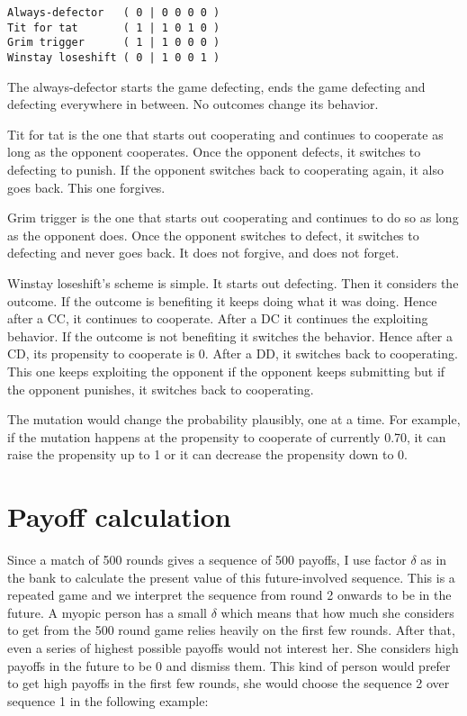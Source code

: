 \documentclass[12.5pt]{report}
\begin{document}
\begin{verbatim}
Always-defector   ( 0 | 0 0 0 0 )
Tit for tat       ( 1 | 1 0 1 0 )
Grim trigger      ( 1 | 1 0 0 0 )
Winstay loseshift ( 0 | 1 0 0 1 )
\end{verbatim}

The always-defector starts the game defecting, ends the game defecting and defecting everywhere in between. No outcomes change its behavior.

Tit for tat is the one that starts out cooperating and continues to cooperate as long as the opponent cooperates. Once the opponent defects, it switches to defecting to punish. If the opponent switches back to cooperating again, it also goes back. This one forgives.

Grim trigger is the one that starts out cooperating and continues to do so as long as the opponent does. Once the opponent switches to defect, it switches to defecting and never goes back. It does not forgive, and does not forget.

Winstay loseshift's scheme is simple. It starts out defecting. Then it considers the outcome. If the outcome is benefiting it keeps doing what it was doing. Hence after a CC, it continues to cooperate. After a DC it continues the exploiting behavior. If the outcome is not benefiting it switches the behavior. Hence after a CD, its propensity to cooperate is 0. After a DD, it switches back to cooperating. This one keeps exploiting the opponent if the opponent keeps submitting but if the opponent punishes, it switches back to cooperating.

The mutation would change the probability plausibly, one at a time. For example, if the mutation happens at the propensity to cooperate of currently 0.70, it can raise the propensity up to 1 or it can decrease the propensity down to 0.

\section{Payoff calculation}
Since a match of 500 rounds gives a sequence of 500 payoffs, I use factor $\delta$ as in the bank to calculate the present value of this future-involved sequence. This is a repeated game and we interpret the sequence from round 2 onwards to be in the future. A myopic person has a small $\delta$ which means that how much she considers to get from the 500 round game relies heavily on the first few rounds. After that, even a series of highest possible payoffs would not interest her. She considers high payoffs in the future to be 0 and dismiss them. This kind of person would prefer to get high payoffs in the first few rounds, she would choose the sequence 2 over sequence 1 in the following example:
\end{document}
